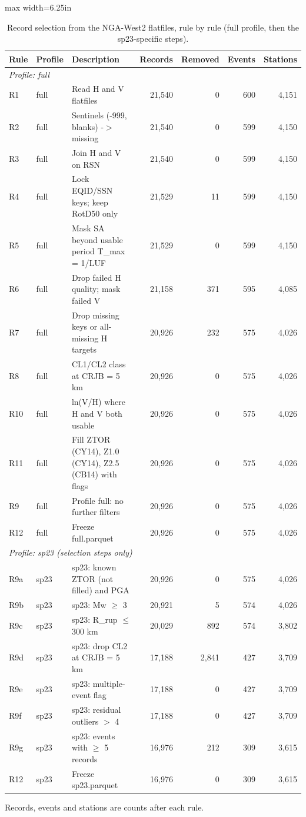 \begin{table}[htbp]
\centering
\caption{Record selection from the NGA-West2 flatfiles, rule by rule (full profile, then the sp23-specific steps).}
\label{tab:table1_attrition}
\small
\begin{adjustbox}{max width=6.25in}
\begin{tabular}{llp{2.6in}rrrr}
\toprule
Rule & Profile & Description & Records & Removed & Events & Stations \\
\midrule
\multicolumn{7}{l}{\textit{Profile: full}} \\
R1 & full & Read H and V flatfiles & 21,540 & 0 & 600 & 4,151 \\
R2 & full & Sentinels (-999, blanks) -$>$ missing & 21,540 & 0 & 599 & 4,150 \\
R3 & full & Join H and V on RSN & 21,540 & 0 & 599 & 4,150 \\
R4 & full & Lock EQID/SSN keys; keep RotD50 only & 21,529 & 11 & 599 & 4,150 \\
R5 & full & Mask SA beyond usable period T\_max = 1/LUF & 21,529 & 0 & 599 & 4,150 \\
R6 & full & Drop failed H quality; mask failed V & 21,158 & 371 & 595 & 4,085 \\
R7 & full & Drop missing keys or all-missing H targets & 20,926 & 232 & 575 & 4,026 \\
R8 & full & CL1/CL2 class at CRJB = 5 km & 20,926 & 0 & 575 & 4,026 \\
R10 & full & ln(V/H) where H and V both usable & 20,926 & 0 & 575 & 4,026 \\
R11 & full & Fill ZTOR (CY14), Z1.0 (CY14), Z2.5 (CB14) with flags & 20,926 & 0 & 575 & 4,026 \\
R9 & full & Profile full: no further filters & 20,926 & 0 & 575 & 4,026 \\
R12 & full & Freeze full.parquet & 20,926 & 0 & 575 & 4,026 \\
\midrule
\multicolumn{7}{l}{\textit{Profile: sp23 (selection steps only)}} \\
R9a & sp23 & sp23: known ZTOR (not filled) and PGA & 20,926 & 0 & 575 & 4,026 \\
R9b & sp23 & sp23: Mw $\geq$ 3 & 20,921 & 5 & 574 & 4,026 \\
R9c & sp23 & sp23: R\_rup $\leq$ 300 km & 20,029 & 892 & 574 & 3,802 \\
R9d & sp23 & sp23: drop CL2 at CRJB = 5 km & 17,188 & 2,841 & 427 & 3,709 \\
R9e & sp23 & sp23: multiple-event flag & 17,188 & 0 & 427 & 3,709 \\
R9f & sp23 & sp23: residual outliers $>$ 4 & 17,188 & 0 & 427 & 3,709 \\
R9g & sp23 & sp23: events with $\geq$ 5 records & 16,976 & 212 & 309 & 3,615 \\
R12 & sp23 & Freeze sp23.parquet & 16,976 & 0 & 309 & 3,615 \\
\bottomrule
\end{tabular}
\end{adjustbox}
\par\smallskip
\parbox{6.25in}{\footnotesize Records, events and stations are counts after each rule.}
\end{table}
